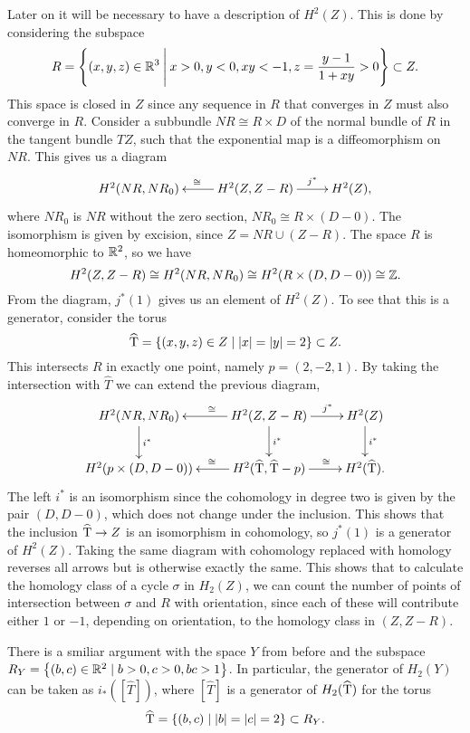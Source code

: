 Later on it will be necessary to have a description of $H^2(Z)$. This
is done by considering the subspace
\[ R = \left\{ (x,y,z) \in \mathbb{R}^3 \:\Bigg\vert\: x > 0, y < 0, xy < -1, z =
  \frac{y-1}{1+xy}>0  \right\} \subset Z. \]
This space is closed in $Z$ since any sequence in $R$ that converges
in $Z$ must also converge in $R$.
Consider a subbundle $NR \cong R\times D$ of the normal
bundle of $R$
in the tangent bundle $TZ$, such that the exponential map is a
diffeomorphism on $NR$. This gives us a diagram
\[ \xymatrix{ H^2(NR,NR_0) & H^2(Z,Z-R) \ar[l]_\cong \ar[r]^>>>>>{j^*} &
  H^2(Z), } \]
where $NR_0$ is $NR$ without the zero section, $NR_0 \cong
R\times(D-0)$. The isomorphism is given by excision, since $Z = NR
\cup (Z-R)$. The space $R$ is homeomorphic to $\mathbb{R}^2$, so we have 
\[ H^2(Z,Z-R) \cong H^2(NR,NR_0) \cong H^2(R\times (D,D-0)) \cong
\mathbb{Z}. \] 
From the diagram, $j^*(1)$ gives us an element of $H^2(Z)$. To see
that this is a generator, consider the torus 
\[ \widehat {\operatorname{T}} = \left\{ (x,y,z)\in Z \mid \left| x \right| = \left| y \right| = 2  \right\}
\subset Z. \]
This intersects $R$ in exactly one point, namely $p=(2,-2,1)$. By
taking the intersection with $\widehat T$ we can extend the previous
diagram,
\[ \xymatrix{ H^2(NR,NR_0) \ar[d]^-{i^*} & H^2(Z,Z-R) \ar[d]^-{i^*}
  \ar[l]_<<<<<\cong \ar[r]^>>>>>{j^*} & H^2(Z) \ar[d]^-{i^*} \\
  H^2(p\times (D,D-0)) & H^2(\widehat \T,\widehat \T-p)
  \ar[r]^>>>>>{\cong} \ar[l]_>>>>>\cong & H^2(\widehat \T).
} \]
The left $i^*$ is an isomorphism since the cohomology in degree two is
given by the pair $(D,D-0)$, which does not change under the
inclusion. This shows that the inclusion $\widehat {\operatorname{T}} \to Z$ is an
isomorphism in cohomology, so $j^*(1)$ is a generator of
$H^2(Z)$. Taking the same diagram with cohomology replaced with
homology reverses all arrows but is otherwise exactly the same. This
shows that to calculate the homology class of a cycle $\sigma$ in
$H_2(Z)$, we can count the number of points of intersection between
$\sigma$ and $R$ with orientation, since each of these will contribute
either $1$ or $-1$, depending on orientation, to the homology class in
$(Z,Z-R)$.

There is a smiliar argument with the space $Y$ from before and the
subspace ${R_Y = \left\{ (b,c) \in \mathbb{R}^2 \mid b > 0, c > 0, bc > 1 \right\}}$. In
particular, the generator of $H_2(Y)$ can be taken as
$i_*\left([\widehat T]\right)$, where $[\widehat
  T]$ is a generator of $H_2(\widehat {\operatorname{T}})$ for the torus 
\[ {\widehat {\operatorname{T}} = \left\{ (b,c)\mid \left| b \right|=\left| c \right| = 2 \right\}} \subset
R_Y. \]

